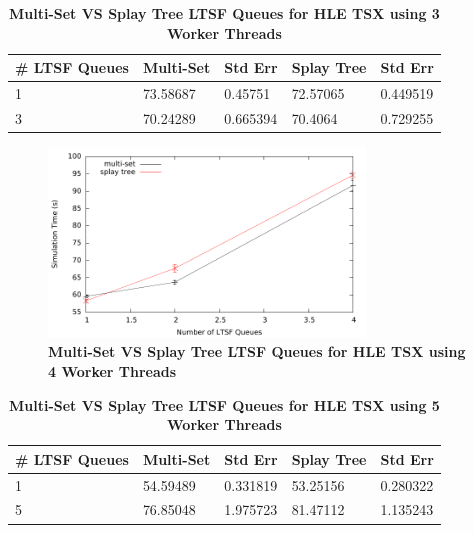 \documentclass[11pt]{book}
\begin{document}
\begin{table}[H]
\centering
\begin{tabular}{l|p{2cm}|p{2cm}|p{2cm}|p{2cm}}
    \textbf{\# LTSF Queues}&Multi-Set &Std Err &Splay Tree &Std Err\\
    \hline
    \midrule
        1 &73.58687   &0.45751  &72.57065   &0.449519\\ 
        3 &70.24289   &0.665394 &70.4064    &0.729255\\
\end{tabular}
\caption{\textbf{Multi-Set VS Splay Tree LTSF Queues for HLE TSX using 3 Worker Threads}}
\label{tab:noThrMig_3threadsXschq_msVSst_hle}
\end{table}

\begin{figure}[H]
    \centering
    \graphicspath{ {./figures/} }
    \includegraphics[width=0.75\textwidth,keepaspectratio]{hugeepidemicsim-NOmig-timeVSschedQs-msVSst-4thread-hle}
\caption{\textbf{Multi-Set VS Splay Tree LTSF Queues for HLE TSX using 4 Worker Threads}}
    \label{fig:noThrMig_timeVSschq_4threads_msVSst_hle}
\end{figure}

\begin{table}[H]
\centering
\begin{tabular}{l|p{2cm}|p{2cm}|p{2cm}|p{2cm}}
    \textbf{\# LTSF Queues}&Multi-Set &Std Err &Splay Tree &Std Err\\
    \hline
    \midrule
        1 &54.59489   &0.331819 &53.25156   &0.280322\\ 
        5 &76.85048   &1.975723 &81.47112   &1.135243\\
\end{tabular}
\caption{\textbf{Multi-Set VS Splay Tree LTSF Queues for HLE TSX using 5 Worker Threads}}
\label{tab:noThrMig_5threadsXschq_msVSst_hle}
\end{table}
\end{document}
